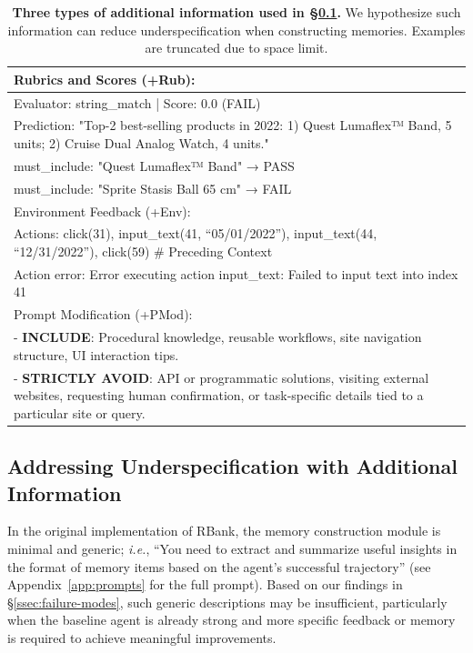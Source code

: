 \documentclass{article}
\begin{document}
\begin{table}
\small
    \caption{\textbf{Three types of additional information used in \S\ref{ssec:additional-info}.} We hypothesize such information can reduce underspecification when constructing memories. Examples are truncated due to space limit.}
    \label{tab:improved-specification}
    \centering
    \begin{tabularx}{\linewidth}{X}
    \toprule
    \rowcolor{gray!10}Rubrics and Scores (+Rub): \\\midrule
    Evaluator: string\_match | Score: 0.0 (FAIL)\\
    Prediction: "Top-2 best-selling products in 2022: 1) Quest Lumaflex™ Band, 5 units; 2) Cruise Dual Analog Watch, 4 units."\\
    must\_include: "Quest Lumaflex™ Band" → PASS\\
    must\_include: "Sprite Stasis Ball 65 cm" → FAIL\\
    \midrule
    \rowcolor{gray!10}Environment Feedback (+Env): \\\midrule
    \textcolor{gray!75}{Actions: click(31), input\_text(41, ``05/01/2022''), 
    input\_text(44, ``12/31/2022''), click(59) {\tiny\# Preceding Context}}\\
    Action error: Error executing action input\_text: Failed to input text into index 41\\\midrule
    \rowcolor{gray!10} Prompt Modification (+PMod): \\\midrule
    - \textbf{INCLUDE}: Procedural knowledge, reusable workflows, site navigation structure, UI interaction tips. \\
    - \textbf{STRICTLY AVOID}: API or programmatic solutions, visiting external websites, requesting human confirmation, or task-specific details tied to a particular site or query. \\
    \bottomrule
    \end{tabularx}
\end{table}

\subsection{Addressing Underspecification with Additional Information}
\label{ssec:additional-info}
In the original implementation of RBank, the memory construction module is minimal and generic; \textit{i.e.}, ``You need to extract and summarize useful insights in the format of memory items based on the agent’s successful trajectory'' (see Appendix~\ref{app:prompts} for the full prompt). Based on our findings in \S\ref{ssec:failure-modes}, such generic descriptions may be insufficient, particularly when the baseline agent is already strong and more specific feedback or memory is required to achieve meaningful improvements.
\end{document}
